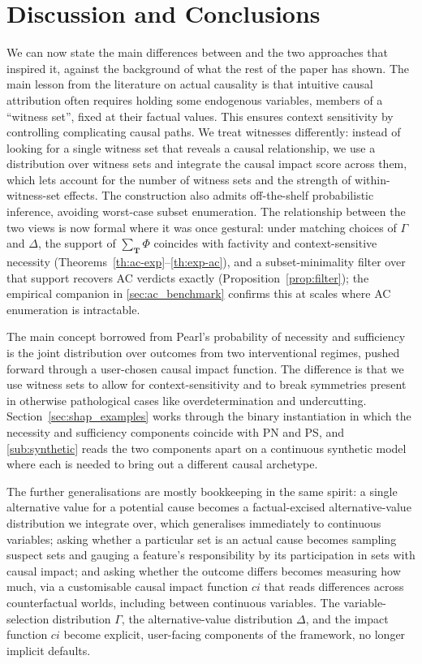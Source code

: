 \section{Discussion and Conclusions}
\label{sec:discussion}

We can now state the main differences between \ourapproach and the
two approaches that inspired it, against the background of what the rest of the paper has
shown. The main lesson from the literature on actual causality is that intuitive causal
attribution often requires holding some endogenous variables, members of a ``witness
set'', fixed at their factual values. This ensures context sensitivity by controlling
complicating causal paths. We treat witnesses differently: instead of looking for
a single witness set that reveals a causal relationship, we use a distribution over
witness sets and integrate the causal impact score across them, which lets
\ourapproach account for the number of witness sets and the strength of
within-witness-set effects. The construction also admits off-the-shelf probabilistic
inference, avoiding worst-case subset enumeration. The relationship between the two
views is now formal where it was once gestural: under matching choices of $\Gamma$ and
$\Delta$, the support of $\sum_{\mathbf{T}}\Phi$ coincides with factivity and
context-sensitive necessity (Theorems~\ref{th:ac-exp}--\ref{th:exp-ac}), and a
subset-minimality filter over that support recovers AC verdicts exactly
(Proposition~\ref{prop:filter}); the empirical companion in \cref{sec:ac_benchmark}
confirms this at scales where AC enumeration is intractable.

The main concept borrowed from Pearl's probability of necessity and sufficiency is the
joint distribution over outcomes from two interventional regimes, pushed forward through
a user-chosen causal impact function. The difference is that we use witness sets to
allow for context-sensitivity and to break symmetries present in otherwise pathological
cases like overdetermination and undercutting. Section~\ref{sec:shap_examples} works
through the binary instantiation in which the necessity and sufficiency components
coincide with PN and PS, and \cref{sub:synthetic} reads the two components apart on
a continuous synthetic model where each is needed to bring out a different causal
archetype.

The further generalisations are mostly bookkeeping in the same spirit: a single
alternative value for a potential cause becomes a factual-excised alternative-value
distribution we integrate over, which generalises immediately to continuous variables;
asking whether a particular set is an actual cause becomes sampling suspect sets and
gauging a feature's responsibility by its participation in sets with causal impact; and
asking whether the outcome differs becomes measuring how much, via a customisable causal
impact function $ci$ that reads differences across counterfactual worlds, including
between continuous variables. The variable-selection distribution $\Gamma$, the
alternative-value distribution $\Delta$, and the impact function $ci$ become explicit,
user-facing components of the framework, no longer implicit defaults.


